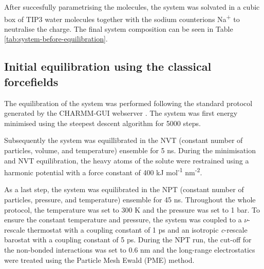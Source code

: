 After succesfully parametrising the molecules, the system was solvated in a cubic box of TIP3 water molecules together with the sodium counterions Na\textsuperscript{+} to neutralise the charge. The final system composition can be seen in Table \ref{tab:system-before-equilibration}.

\subsection{Initial equilibration using the classical forcefields}
The equilibration of the system was performed following the standard protocol generated by the CHARMM-GUI webserver \citep{joCHARMMGUIWebbasedGraphical2008}. The system was first energy minimised using the steepest descent algorithm for 5000 steps. 

Subsequently the system was equillibrated in the NVT (constant number of particles, volume, and temperature) ensemble for 5 ns. During the minimisation and NVT equilibration, the heavy atoms of the solute were restrained using a harmonic potential with a force constant of 400 kJ mol\textsuperscript{-1} nm\textsuperscript{-2}.

As a last step, the system was equilibrated in the NPT (constant number of particles, pressure, and temperature) ensemble for 45 ns. Throughout the whole protocol, the temperature was set to 300 K and the pressure was set to 1 bar. To ensure the constant temperature and pressure, the system was coupled to a $\nu$-rescale thermostat \citep{bussiCanonicalSamplingVelocity2007} with a coupling constant of 1 ps and an isotropic \textit{c}-rescale barostat \citep{bernettiPressureControlUsing2020} with a coupling constant of 5 ps. During the NPT run, the cut-off for the non-bonded interactions was set to 0.6 nm and the long-range electrostatics were treated using the Particle Mesh Ewald (PME) method.

